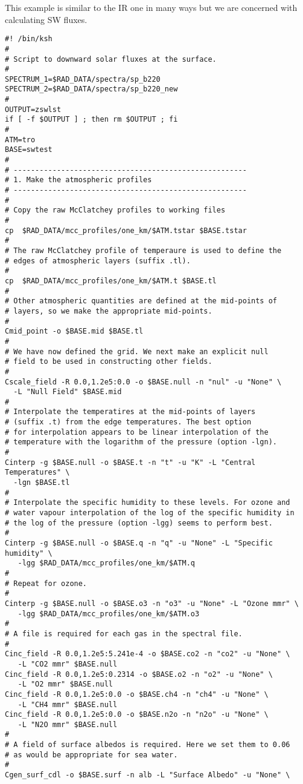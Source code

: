 This example is similar to the IR one in many ways but
we are concerned with calculating SW fluxes.

{\small
\begin{verbatim}
#! /bin/ksh
#
# Script to downward solar fluxes at the surface.
#
SPECTRUM_1=$RAD_DATA/spectra/sp_b220
SPECTRUM_2=$RAD_DATA/spectra/sp_b220_new
#
OUTPUT=zswlst
if [ -f $OUTPUT ] ; then rm $OUTPUT ; fi
#
ATM=tro
BASE=swtest
#
# ------------------------------------------------------
# 1. Make the atmospheric profiles
# ------------------------------------------------------
#
# Copy the raw McClatchey profiles to working files
#
cp  $RAD_DATA/mcc_profiles/one_km/$ATM.tstar $BASE.tstar
#
# The raw McClatchey profile of temperaure is used to define the
# edges of atmospheric layers (suffix .tl).
#
cp  $RAD_DATA/mcc_profiles/one_km/$ATM.t $BASE.tl
#
# Other atmospheric quantities are defined at the mid-points of
# layers, so we make the appropriate mid-points.
#
Cmid_point -o $BASE.mid $BASE.tl
#
# We have now defined the grid. We next make an explicit null
# field to be used in constructing other fields.
#
Cscale_field -R 0.0,1.2e5:0.0 -o $BASE.null -n "nul" -u "None" \
  -L "Null Field" $BASE.mid
#
# Interpolate the temperatires at the mid-points of layers
# (suffix .t) from the edge temperatures. The best option
# for interpolation appears to be linear interpolation of the
# temperature with the logarithm of the pressure (option -lgn).
#
Cinterp -g $BASE.null -o $BASE.t -n "t" -u "K" -L "Central Temperatures" \
  -lgn $BASE.tl
#
# Interpolate the specific humidity to these levels. For ozone and
# water vapour interpolation of the log of the specific humidity in
# the log of the pressure (option -lgg) seems to perform best.
#
Cinterp -g $BASE.null -o $BASE.q -n "q" -u "None" -L "Specific humidity" \
   -lgg $RAD_DATA/mcc_profiles/one_km/$ATM.q
#
# Repeat for ozone.
#
Cinterp -g $BASE.null -o $BASE.o3 -n "o3" -u "None" -L "Ozone mmr" \
   -lgg $RAD_DATA/mcc_profiles/one_km/$ATM.o3
#
# A file is required for each gas in the spectral file.
#
Cinc_field -R 0.0,1.2e5:5.241e-4 -o $BASE.co2 -n "co2" -u "None" \
   -L "CO2 mmr" $BASE.null
Cinc_field -R 0.0,1.2e5:0.2314 -o $BASE.o2 -n "o2" -u "None" \
   -L "O2 mmr" $BASE.null
Cinc_field -R 0.0,1.2e5:0.0 -o $BASE.ch4 -n "ch4" -u "None" \
   -L "CH4 mmr" $BASE.null
Cinc_field -R 0.0,1.2e5:0.0 -o $BASE.n2o -n "n2o" -u "None" \
   -L "N2O mmr" $BASE.null
#
# A field of surface albedos is required. Here we set them to 0.06
# as would be appropriate for sea water.
#
Cgen_surf_cdl -o $BASE.surf -n alb -L "Surface Albedo" -u "None" \

\end{verbatim}}
